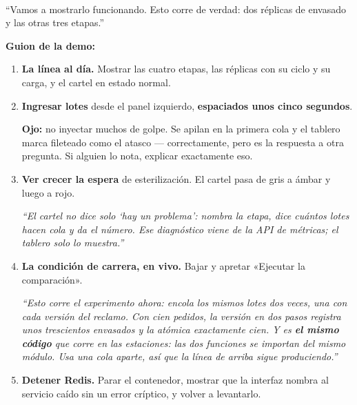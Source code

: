 \documentclass[11pt,a4paper]{article}
\newcommand{\lamina}[2]{%
  \vspace{14pt}%
  \noindent{\color{tealu}\rule{\linewidth}{1.2pt}}\\[2pt]
  \noindent{\bfseries\color{tealu}DIAPOSITIVA #1}\quad{\bfseries\color{tinta}#2}\par\vspace{4pt}}
\newenvironment{decir}
  {\begin{list}{}{\setlength{\leftmargin}{14pt}\setlength{\rightmargin}{0pt}%
    \setlength{\itemindent}{0pt}\setlength{\listparindent}{0pt}%
    \setlength{\parsep}{6pt}}\item[]%
    \color{tinta}}
  {\end{list}}
\begin{document}
\lamina{12}{Demo en vivo ($\sim$4 minutos)}
\begin{decir}
``Vamos a mostrarlo funcionando. Esto corre de verdad: dos réplicas de
envasado y las otras tres etapas.''
\end{decir}

\noindent\textbf{Guion de la demo:}
\begin{enumerate}[leftmargin=18pt, itemsep=4pt, topsep=4pt]
  \item \textbf{La línea al día.} Mostrar las cuatro etapas, las réplicas con su
        ciclo y su carga, y el cartel en estado normal.
  \item \textbf{Ingresar lotes} desde el panel izquierdo, \textbf{espaciados
        unos cinco segundos}.

        {\small\color{ambar}\textbf{Ojo:} no inyectar muchos de golpe. Se apilan
        en la primera cola y el tablero marca fileteado como el atasco ---
        correctamente, pero es la respuesta a otra pregunta. Si alguien lo
        nota, explicar exactamente eso.}
  \item \textbf{Ver crecer la espera} de esterilización. El cartel pasa de gris
        a ámbar y luego a rojo.

        {\small\itshape ``El cartel no dice solo `hay un problema': nombra la
        etapa, dice cuántos lotes hacen cola y da el número. Ese diagnóstico
        viene de la API de métricas; el tablero solo lo muestra.''}
  \item \textbf{La condición de carrera, en vivo.} Bajar y apretar «Ejecutar la
        comparación».

        {\small\itshape ``Esto corre el experimento ahora: encola los mismos
        lotes dos veces, una con cada versión del reclamo. Con cien pedidos, la
        versión en dos pasos registra unos trescientos envasados y la atómica
        exactamente cien. Y es \textbf{el mismo código} que corre en las
        estaciones: las dos funciones se importan del mismo módulo. Usa una
        cola aparte, así que la línea de arriba sigue produciendo.''}
  \item \textbf{Detener Redis.} Parar el contenedor, mostrar que la interfaz
        nombra al servicio caído sin un error críptico, y volver a levantarlo.
\end{enumerate}

\end{document}

